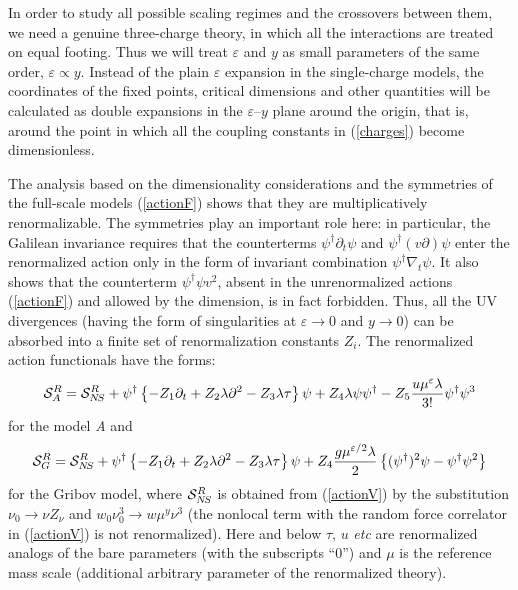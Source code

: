 \documentclass[12pt]{iopart}
\begin{document}
In order to study all possible scaling regimes and the crossovers between
them, we need a genuine three-charge theory, in which all the interactions
are treated on equal footing. Thus we will treat $\varepsilon$ and $y$ as
small parameters of the same order, $\varepsilon \propto y$.
Instead of the plain $\varepsilon$ expansion in the single-charge models,
the coordinates of the fixed points, critical dimensions
and other quantities will be calculated as double expansions in the
$\varepsilon$--$y$ plane around the origin, that is, around the point
in which all the coupling constants in (\ref{charges}) become
dimensionless.

The analysis based on the dimensionality considerations and the symmetries
of the full-scale models (\ref{actionF}) shows that they are multiplicatively
renormalizable. The symmetries play an important role here: in particular,
the Galilean invariance requires that the counterterms
$\psi^{\dag} \partial _{t}\psi$ and $\psi^{\dag} (v\partial) \psi$
enter the renormalized action only in the form of invariant combination
$\psi^{\dag} \nabla _{t}\psi$. It also shows that the counterterm
$\psi^{\dag} \psi v^{2}$, absent in the unrenormalized actions
(\ref{actionF}) and allowed by the dimension, is in fact forbidden.
Thus, all the UV divergences (having the form of singularities at
$\varepsilon\to0$ and $y\to0$) can be absorbed into a finite set of
renormalization constants $Z_{i}$. The renormalized action functionals
have the forms:
\begin{equation}
{\cal S}_{A}^{R} = {\cal S}_{N\!S}^{R} +
\psi^{\dag}
\left\{ -Z_{1}\partial_{t}+Z_{2}\lambda \partial^{2}
- Z_{3}\lambda\tau\right\}\psi + Z_{4}\lambda \psi\psi^{\dagger}
-Z_{5} \frac{u\mu^{\varepsilon} \lambda}{3!} \psi^{\dag}\psi^3
\label{actionAR}
\end{equation}
for the model {\it A} and
\begin{equation}
{\cal S}_{G}^{R} = {\cal S}_{N\!S}^{R} +
\psi^{\dag}
\left\{-Z_{1}\partial_{t}+Z_{2}\lambda \partial^{2}- Z_{3}\lambda\tau\right\}
\psi +Z_{4}
\frac{g\mu^{\varepsilon/2}\lambda}{2} \left\{ (\psi^{\dagger})^2\psi -
\psi^{\dagger}\psi^2  \right\}
\label{actionGR}
\end{equation}
for the Gribov model, where ${\cal S}_{N\!S}^{R}$ is obtained from
(\ref{actionV}) by the substitution $\nu_0\to\nu Z_{\nu}$ and
$w_{0} \nu_0^{3}\to w \mu^y\nu^{3}$ (the nonlocal term with the random force
correlator in (\ref{actionV}) is not renormalized). Here and below
$\tau$, $u$ {\it etc} are renormalized analogs of the
bare parameters (with the subscripts ``0'') and $\mu$ is the reference mass
scale (additional arbitrary parameter of the renormalized theory).
\end{document}

